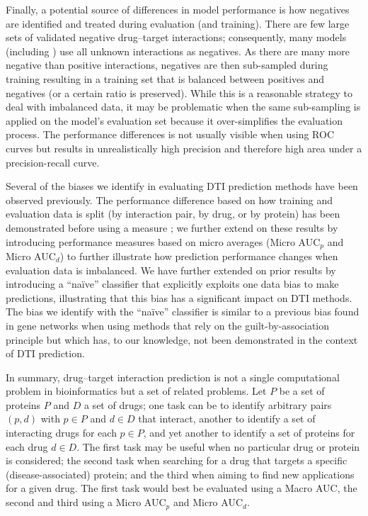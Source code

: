 \documentclass{bioinfo}
\renewcommand{\cite}{\citep}
\begin{document}
Finally, a potential source of differences in model performance is how
negatives are identified and treated during evaluation (and
training). There are few large sets of validated negative drug--target
interactions; consequently, many models (including \name{}) use all
unknown interactions as negatives. As there are many more negative
than positive interactions, negatives are then sub-sampled during
training resulting in a training set that is balanced between
positives and negatives (or a certain ratio is preserved). While this
is a reasonable strategy to deal with imbalanced data, it may be
problematic when the same sub-sampling is applied on the model's
evaluation set because it over-simplifies the evaluation process. The
performance differences is not usually visible when using ROC curves
but results in unrealistically high precision and therefore high area
under a precision-recall curve.

Several of the biases we identify in evaluating DTI prediction methods
have been observed previously. The performance difference based on how
training and evaluation data is split (by interaction pair, by drug,
or by protein) has been demonstrated before using a
 measure \cite{}; we further extend on
these results by introducing performance measures based on micro
averages (Micro AUC$_p$ and Micro AUC$_d$) to further illustrate how
prediction performance changes when evaluation data is imbalanced. We
have further extended on prior results by introducing a ``na\"ive''
classifier that explicitly exploits one data bias to make predictions,
illustrating that this bias has a significant impact on DTI
methods. The bias we identify with the ``na\"ive'' classifier is
similar to a previous bias found in gene networks when using methods
that rely on the guilt-by-association principle
\cite{Gillis2012} but which has, to our knowledge,
not been demonstrated in the context of DTI prediction.

In summary, drug--target interaction prediction is not a single
computational problem in bioinformatics but a set of related
problems. Let $P$ be a set of proteins $P$ and $D$ a set of drugs; one
task can be to identify arbitrary pairs $(p,d)$ with $p \in P$ and
$d \in D$ that interact, another to identify a set of interacting
drugs for each $p \in P$, and yet another to identify a set of
proteins for each drug $d \in D$. The first task may be useful when no
particular drug or protein is considered; the second task when
searching for a drug that targets a specific (disease-associated)
protein; and the third when aiming to find new applications for a
given drug. The first task would best be evaluated using a Macro AUC,
the second and third using a Micro AUC$_p$ and Micro AUC$_d$.
\end{document}
